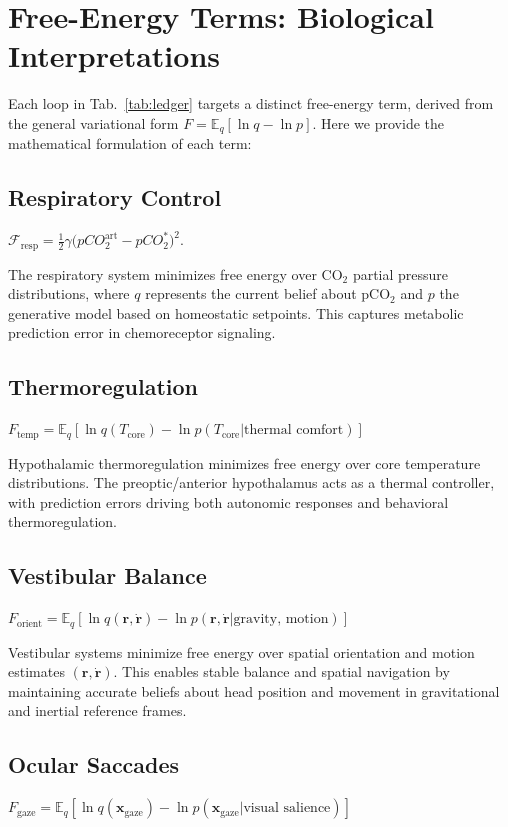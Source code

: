 \documentclass[11pt]{article}
\newcommand{\precision}{\gamma}        %
\newcommand{\FreeE}{\mathcal F}        %
\begin{document}
\section{Free-Energy Terms: Biological Interpretations}

Each loop in Tab.~\ref{tab:ledger} targets a distinct free-energy term, derived from the general variational form $F = \mathbb{E}_q[\ln q - \ln p]$. Here we provide the mathematical formulation of each term:

\subsection{Respiratory Control}
$\FreeE_{\text{resp}}=\tfrac12\precision\bigl(pCO_2^{\text{art}}-pCO_2^{*}\bigr)^2.$

The respiratory system minimizes free energy over CO$_2$ partial pressure distributions, where $q$ represents the current belief about pCO$_2$ and $p$ the generative model based on homeostatic setpoints. This captures metabolic prediction error in chemoreceptor signaling.

\subsection{Thermoregulation}
$F_{\text{temp}} = \mathbb{E}_q[\ln q(T_{\text{core}}) - \ln p(T_{\text{core}}|\text{thermal comfort})]$

Hypothalamic thermoregulation minimizes free energy over core temperature distributions. The preoptic/anterior hypothalamus acts as a thermal controller, with prediction errors driving both autonomic responses and behavioral thermoregulation.

\subsection{Vestibular Balance}
$F_{\text{orient}} = \mathbb{E}_q[\ln q(\mathbf{r}, \dot{\mathbf{r}}) - \ln p(\mathbf{r}, \dot{\mathbf{r}}|\text{gravity, motion})]$

Vestibular systems minimize free energy over spatial orientation and motion estimates $(\mathbf{r}, \dot{\mathbf{r}})$. This enables stable balance and spatial navigation by maintaining accurate beliefs about head position and movement in gravitational and inertial reference frames.

\subsection{Ocular Saccades}
$F_{\text{gaze}} = \mathbb{E}_q[\ln q(\mathbf{x}_{\text{gaze}}) - \ln p(\mathbf{x}_{\text{gaze}}|\text{visual salience})]$
\end{document}
